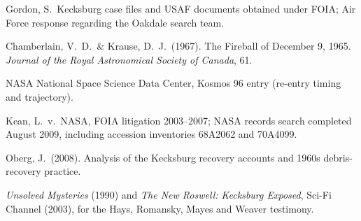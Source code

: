 \begin{srcnotes}
\item Gordon, S.\ Kecksburg case files and USAF documents obtained under FOIA; Air Force response
regarding the Oakdale search team.
\item Chamberlain, V.\ D.\ \& Krause, D.\ J.\ (1967). The Fireball of December 9, 1965.
\emph{Journal of the Royal Astronomical Society of Canada}, 61.
\item NASA National Space Science Data Center, Kosmos 96 entry (re-entry timing and trajectory).
\item Kean, L.\ v.\ NASA, FOIA litigation 2003--2007; NASA records search completed August 2009,
including accession inventories 68A2062 and 70A4099.
\item Oberg, J.\ (2008). Analysis of the Kecksburg recovery accounts and 1960s debris-recovery
practice.
\item \emph{Unsolved Mysteries} (1990) and \emph{The New Roswell: Kecksburg Exposed}, Sci-Fi
Channel (2003), for the Hays, Romansky, Mayes and Weaver testimony.
\end{srcnotes}
